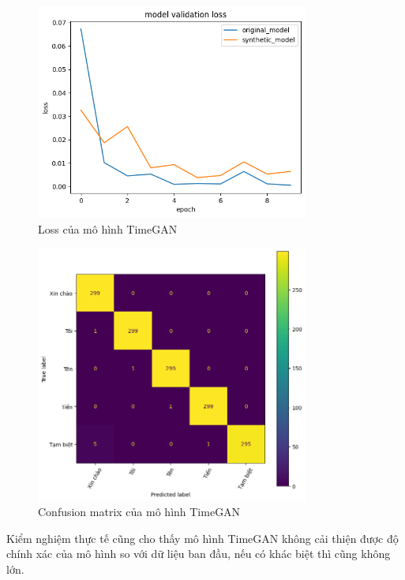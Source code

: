 \begin{figure}[H]
    \centering
    \includegraphics[width=0.8\textwidth]{Images/Improvement results/TimeGAN_loss.png}
    \caption{Loss của mô hình TimeGAN}
    \label{fig:timegan_loss}
\end{figure}

\begin{figure}
    \centering
    \includegraphics[width=0.8\textwidth]{Images/Improvement results/TimeGAN_confusionmatrix.png}
    \caption{Confusion matrix của mô hình TimeGAN}
    \label{fig:timegan_confusion_matrix}
\end{figure}

Kiểm nghiệm thực tế cũng cho thấy mô hình TimeGAN không cải thiện được độ chính xác của mô hình so với dữ liệu ban đầu, nếu có khác biệt thì cũng không lớn.


